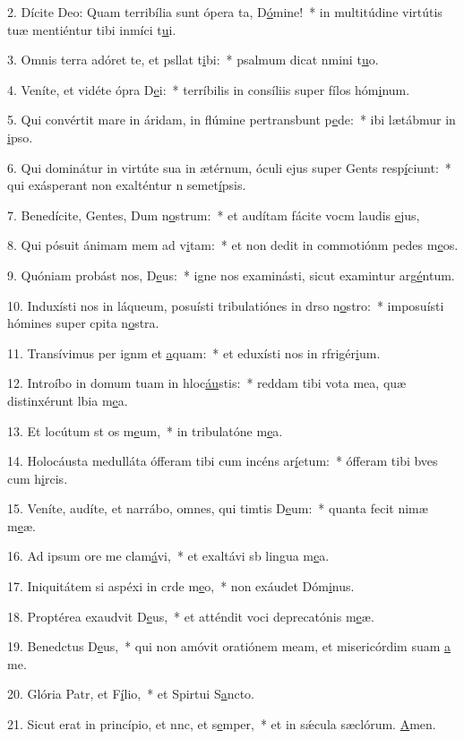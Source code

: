 2. Dícite Deo: Quam terribília sunt ópera ta, D\uline{ó}mine!~* in multitúdine virtútis tuæ mentiéntur tibi inmíci t\uline{u}i.\par 
3. Omnis terra adóret te, et psllat t\uline{i}bi:~* psalmum dicat nmini t\uline{u}o.\par 
4. Veníte, et vidéte ópra D\uline{e}i:~* terríbilis in consíliis super fílos hóm\uline{i}num.\par 
5. Qui convértit mare in áridam, in flúmine pertransbunt p\uline{e}de:~* ibi lætábmur in \uline{i}pso.\par 
6. Qui dominátur in virtúte sua in ætérnum, óculi ejus super Gents resp\uline{í}ciunt:~* qui exásperant non exalténtur n semet\uline{í}psis.\par 
7. Benedícite, Gentes, Dum n\uline{o}strum:~* et audítam fácite vocm laudis \uline{e}jus,\par 
8. Qui pósuit ánimam mem ad v\uline{i}tam:~* et non dedit in commotiónm pedes m\uline{e}os.\par 
9. Quóniam probást nos, D\uline{e}us:~* igne nos examinásti, sicut examintur arg\uline{é}ntum.\par 
10. Induxísti nos in láqueum, posuísti tribulatiónes in drso n\uline{o}stro:~* imposuísti hómines super cpita n\uline{o}stra.\par 
11. Transívimus per ignm et \uline{a}quam:~* et eduxísti nos in rfrigér\uline{i}um.\par 
12. Introíbo in domum tuam in hloc\uline{áu}stis:~* reddam tibi vota mea, quæ distinxérunt lbia m\uline{e}a.\par 
13. Et locútum st os m\uline{e}um,~* in tribulatóne m\uline{e}a.\par 
14. Holocáusta medulláta ófferam tibi cum incéns ar\uline{í}etum:~* ófferam tibi bves cum h\uline{i}rcis.\par 
15. Veníte, audíte, et narrábo, omnes, qui timtis D\uline{e}um:~* quanta fecit nimæ m\uline{e}æ.\par 
16. Ad ipsum ore me clam\uline{á}vi,~* et exaltávi sb lingua m\uline{e}a.\par 
17. Iniquitátem si aspéxi in crde m\uline{e}o,~* non exáudet Dóm\uline{i}nus.\par 
18. Proptérea exaudvit D\uline{e}us,~* et atténdit voci deprecatónis m\uline{e}æ.\par 
19. Benedctus D\uline{e}us,~* qui non amóvit oratiónem meam, et misericórdim suam \uline{a} me.\par 
20. Glória Patr, et F\uline{í}lio,~* et Spirtui S\uline{a}ncto.\par 
21. Sicut erat in princípio, et nnc, et s\uline{e}mper,~* et in sǽcula sæclórum. \uline{A}men.\par 
